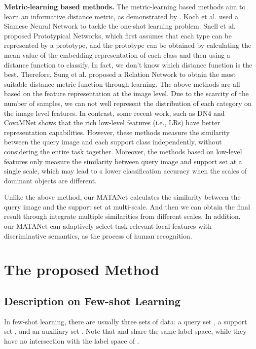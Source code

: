 \documentclass[final]{cvpr}
\begin{document}
	\textbf{Metric-learning based methods. }
	The metric-learning based methods aim to learn an informative distance metric, as demonstrated by \cite{vinyals2016matching,snell2017prototypical,sung2018learning,allen2019infinite,garcia2017few,li2019distribution,li2019revisiting,simon2020adaptive}.
	Koch et al. \cite{koch2015siamese} used a Siamese Neural Network to tackle the one-shot learning problem. Snell et al. \cite{snell2017prototypical} proposed Prototypical Networks, which first assumes that each type can be represented by a prototype, and the prototype can be obtained by calculating the mean value of the embedding representation of each class and then using a distance function to classify. In fact, we don't know which distance function is the best. Therefore, Sung et al. \cite{sung2018learning} proposed a Relation Network to obtain the most suitable distance metric function through learning. 
	The above methods are all based on the feature representation at the image level. Due to the scarcity of the number of samples, we can not well represent the distribution of each category on the image level features. In contrast, some recent work, such as DN4 \cite{li2019revisiting} and CovaMNet \cite{li2019distribution} shows that the rich low-level features (i.e., LRs) have better representation capabilities. However, these methods measure the similarity between the query image and each support class independently, without considering the entire task together. Moreover, the methods based on low-level features only measure the similarity between query image and support set at a single scale, which may lead to a lower classification accuracy when the scales of dominant objects are different. 
	
	Unlike the above method, our MATANet calculates the similarity between the query image and the support set at multi-scale. And then we can obtain the final result through integrate multiple similarities from different scales. In addition, our MATANet can adaptively select task-relevant local features with discriminative semantics, as the process of human recognition.
	
	
	\section{The proposed Method}
	
	\subsection{Description on Few-shot Learning}
	In few-shot learning, there are usually three sets of data: a query set , a support set , and an auxiliary set . Note that  and  share the same label space, while they have no intersection with the label space of . 
	
\end{document}
